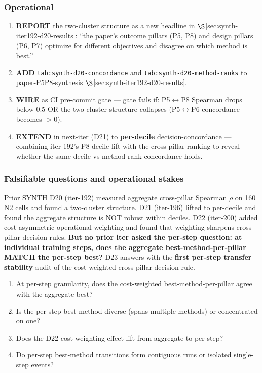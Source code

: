 \documentclass{article}
\begin{document}
\subsubsection{Operational}\label{sec:synth-iter192-d20-operational}
\begin{enumerate}
\item \textbf{REPORT} the two-cluster structure as a new headline in
  $\S$\ref{sec:synth-iter192-d20-results}: ``the paper's outcome
  pillars (P5, P8) and design pillars (P6, P7) optimize for different
  objectives and disagree on which method is best.''
\item \textbf{ADD} \texttt{tab:synth-d20-concordance} and
  \texttt{tab:synth-d20-method-ranks} to
  paper-P5P8-synthesis $\S$\ref{sec:synth-iter192-d20-results}.
\item \textbf{WIRE} as CI pre-commit gate --- gate fails if:
  P5$\leftrightarrow$P8 Spearman drops below $0.5$ OR the two-cluster
  structure collapses (P5$\leftrightarrow$P6 concordance becomes $> 0$).
\item \textbf{EXTEND} in next-iter (D21) to \textbf{per-decile}
  decision-concordance --- combining iter-192's P8 decile lift with the
  cross-pillar ranking to reveal whether the same decile-vs-method rank
  concordance holds.
\end{enumerate} 

\subsubsection{Falsifiable questions and operational stakes}\label{sec:synth-d23-questions}
Prior SYNTH D20 (iter-192) measured aggregate cross-pillar Spearman $\rho$
on 160 N2 cells and found a two-cluster structure. D21 (iter-196) lifted
to per-decile and found the aggregate structure is NOT robust within
deciles. D22 (iter-200) added cost-asymmetric operational weighting and
found that weighting sharpens cross-pillar decision rules. \textbf{But
no prior iter asked the per-step question: at individual training steps,
does the aggregate best-method-per-pillar MATCH the per-step best?} D23
answers with the \textbf{first per-step transfer stability} audit of the
cost-weighted cross-pillar decision rule.

\begin{enumerate}
\item At per-step granularity, does the cost-weighted best-method-per-pillar
  agree with the aggregate best?
\item Is the per-step best-method diverse (spans multiple methods) or
  concentrated on one?
\item Does the D22 cost-weighting effect lift from aggregate to per-step?
\item Do per-step best-method transitions form contiguous runs or isolated
  single-step events?
\end{enumerate}
\end{document}
